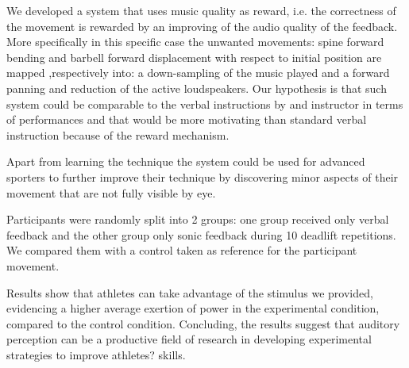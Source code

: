 \documentclass[10pt,letterpaper]{article}
\begin{document}
We developed a system that uses music quality as reward, i.e. the correctness of the movement is rewarded by an improving of the audio quality of the feedback. More specifically in this specific case the unwanted movements: spine forward bending and barbell forward displacement with respect to initial position are mapped ,respectively into: a down-sampling of the music played and a forward panning and reduction of the active loudspeakers.
Our hypothesis is that such system could be comparable to the verbal instructions by and instructor in terms of performances and that would be more motivating than standard verbal instruction because of the reward mechanism.


Apart from learning the technique the system could be used for advanced sporters to further improve their technique by discovering minor aspects of their movement that are not fully visible by eye.

Participants were randomly split into 2 groups: one group received only verbal feedback and the other group only sonic feedback during 10 deadlift repetitions. We compared them with a control taken as reference for the participant movement.

Results show that athletes can take advantage of the stimulus we provided, evidencing a higher average exertion of power in the experimental condition, compared to the control condition. Concluding, the results suggest that auditory perception can be a productive field of research in developing experimental strategies to improve athletes? skills.
\end{document}
